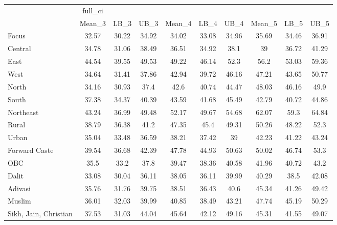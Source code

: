 \begin{tabular}{l*{9}{c}}
\toprule
                    &     full\_ci&            &            &            &            &            &            &            &            \\
                    &      Mean\_3&        LB\_3&        UB\_3&      Mean\_4&        LB\_4&        UB\_4&      Mean\_5&        LB\_5&        UB\_5\\
\midrule
Focus               &       32.57&       30.22&       34.92&       34.02&       33.08&       34.96&       35.69&       34.46&       36.91\\
Central             &       34.78&       31.06&       38.49&       36.51&       34.92&        38.1&          39&       36.72&       41.29\\
East                &       44.54&       39.55&       49.53&       49.22&       46.14&        52.3&        56.2&       53.03&       59.36\\
West                &       34.64&       31.41&       37.86&       42.94&       39.72&       46.16&       47.21&       43.65&       50.77\\
North               &       34.16&       30.93&        37.4&        42.6&       40.74&       44.47&       48.03&       46.16&        49.9\\
South               &       37.38&       34.37&       40.39&       43.59&       41.68&       45.49&       42.79&       40.72&       44.86\\
Northeast           &       43.24&       36.99&       49.48&       52.17&       49.67&       54.68&       62.07&        59.3&       64.84\\
Rural               &       38.79&       36.38&        41.2&       47.35&        45.4&       49.31&       50.26&       48.22&        52.3\\
Urban               &       35.04&       33.48&       36.59&       38.21&       37.42&          39&       42.23&       41.22&       43.24\\
Forward Caste       &       39.54&       36.68&       42.39&       47.78&       44.93&       50.63&       50.02&       46.74&        53.3\\
OBC                 &        35.5&        33.2&        37.8&       39.47&       38.36&       40.58&       41.96&       40.72&        43.2\\
Dalit               &       33.08&       30.04&       36.11&       38.05&       36.11&       39.99&       40.29&        38.5&       42.08\\
Adivasi             &       35.76&       31.76&       39.75&       38.51&       36.43&        40.6&       45.34&       41.26&       49.42\\
Muslim              &       36.01&       32.03&       39.99&       40.85&       38.49&       43.21&       47.74&       45.19&       50.29\\
Sikh, Jain, Christian&       37.53&       31.03&       44.04&       45.64&       42.12&       49.16&       45.31&       41.55&       49.07\\
\bottomrule
\end{tabular}
